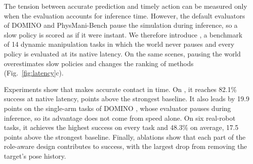 

The tension between accurate prediction and timely action can be measured only when the evaluation accounts for inference time. However, the default evaluators of DOMINO \cite{domino} and PhysMani-Bench \cite{physmani} pause the simulation during inference, so a slow policy is scored as if it were instant. 
We therefore introduce \textbf{\bench}, a benchmark of 14 dynamic manipulation tasks in which the world never pauses and every policy is evaluated at its native latency. 
On the same scenes, pausing the world overestimates slow policies and changes the ranking of methods (Fig.~\ref{fig:latency}c).

Experiments show that \ours makes accurate contact in time. 
On \bench, it reaches 82.1\% success at native latency, \nativeLead{} points above the strongest baseline.
It also leads by 19.9 points on the single-arm tasks of DOMINO \cite{domino}, whose evaluator pauses during inference, so its advantage does not come from speed alone. 
On six real-robot tasks, it achieves the highest success on every task and 48.3\% on average, 17.5 points above the strongest baseline. 
Finally, ablations show that each part of the role-aware design contributes to success,
with the largest drop from removing the target's pose history.


